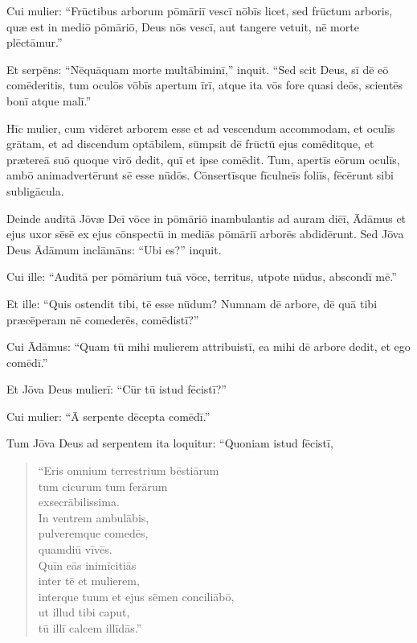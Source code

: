 \Versus Cui mulier: ``Frūctibus arborum pōmāriī vescī nōbīs licet,
\Versus sed frūctum arboris, quæ est in mediō pōmāriō, Deus nōs vescī, aut tangere vetuit, nē morte plēctāmur.''

\Versus Et serpēns: ``Nēquāquam morte multābiminī,'' inquit.
\Versus ``Sed scit Deus, sī dē eō comēderitis, tum oculōs vōbīs apertum īrī, atque ita vōs fore quasi deōs, scientēs bonī atque malī.''

\Versus Hīc mulier, cum vidēret arborem esse et ad vescendum accommodam, et oculīs grātam, et ad discendum optābilem, sūmpsit dē frūctū ejus comēditque, et prætereā suō quoque virō dedit, quī et ipse comēdit.
\Versus Tum, apertīs eōrum oculīs, ambō animadvertērunt sē esse nūdōs. Cōnsertīsque fīculneīs foliīs, fēcērunt sibi subligācula.

\Versus Deinde audītā Jōvæ Deī vōce in pōmāriō inambulantis ad auram diēī, Ādāmus et ejus uxor sēsē ex ejus cōnspectū in mediās pōmāriī arborēs abdidērunt.
\Versus Sed Jōva Deus Ādāmum inclāmāns: ``Ubi es?'' inquit.

\Versus Cui ille: ``Audītā per pōmārium tuā vōce, territus, utpote nūdus, abscondī mē.''

\Versus Et ille: ``Quis ostendit tibi, tē esse nūdum? Numnam dē arbore, dē quā tibi præcēperam nē comederēs, comēdistī?''

\Versus Cui Ādāmus: ``Quam tū mihi mulierem attribuistī, ea mihi dē arbore dedit, et ego comēdī.''

\Versus Et Jōva Deus mulierī: ``Cūr tū istud fēcistī?''

Cui mulier: ``Ā serpente dēcepta comēdī.''

\Versus Tum Jōva Deus ad serpentem ita loquitur: ``Quoniam istud fēcistī,

\begin{verse}
\begin{patverse*}
``Eris omnium terrestrium bēstiārum \\
 tum cicurum tum ferārum \\
 exsecrābilissima. \\
 In ventrem ambulābis, \\
 pulveremque comedēs, \\
 quamdiū vīvēs. \\
\Versus Quīn eās inimīcitiās \\
 inter tē et mulierem, \\
 interque tuum et ejus sēmen conciliābō, \\
 ut illud tibi caput, \\
 tū illī calcem illīdās.''
\end{patverse*}
\end{verse}

